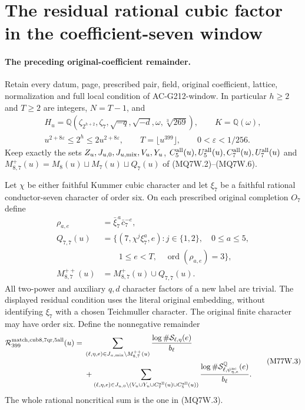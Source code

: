 \section{The residual rational cubic factor in the coefficient-seven window}
\label{sec:mixed-cubic-seven-at-seven-window}

\paragraph{The preceding original-coefficient remainder.}
Retain every datum, page, prescribed pair, field, original coefficient,
lattice, normalization and full local condition of AC-G212-window.
In particular $h\geq2$ and $T\geq2$ are integers, $N=T-1$, and
\[
 \begin{gathered}
 H_u=\mathbb Q(\zeta_{2^{h+2}},\zeta_7,\sqrt{-q},\sqrt{-d},
                   \omega,\sqrt[3]{269}),\qquad K=\mathbb Q(\omega),\\
 u^{2+8\varepsilon}\leq2^h\leq2u^{2+8\varepsilon},\qquad
 T=\lfloor u^{399}\rfloor,\qquad0<\varepsilon<1/256.
 \end{gathered}\tag{M77W.1}
\]
Keep exactly the sets $Z_u,J_{u,0},J_{u,\rm mix},V_u,Y_u$,
$C_5^{\rm all}(u),U_5^{\rm all}(u),C_7^{\rm all}(u),U_7^{\rm all}(u)$
and $M_{8,7}^{+}(u)=M_8(u)\sqcup M_7(u)\sqcup Q_7(u)$
of (MQ7W.2)--(MQ7W.6).

Let $\chi$ be either faithful Kummer cubic character and let
$\xi_7$ be a faithful rational conductor-seven character of order six.
On each prescribed original completion $O_7$ define
\[
 \begin{split}
 \rho_{a,e}&=\bar\xi_7^{\,a}\bar c_7^{-e},\\
 Q_{7,7}(u)&=\{(7,\chi^j\xi_7^a,e):j\in\{1,2\},\quad0\leq a\leq5,\\
       &\qquad1\leq e<T,\quad\operatorname{ord}(\rho_{a,e})=3\},\\
 M_{8,7}^{++}(u)&=M_{8,7}^{+}(u)\cup Q_{7,7}(u).
 \end{split}\tag{M77W.2}
\]
All two-power and auxiliary $q,d$ character factors of a new label
are trivial. The displayed residual condition uses the literal
original embedding, without identifying $\xi_7$ with a chosen
Teichmuller character. The original finite character may have order six.
Define the nonnegative remainder
\[
 \begin{split}
 \mathcal R_{399}^{\rm match,cub8,7qr,5all}(u)={}&
  \sum_{(\ell,\eta,e)\in J_{u,\rm mix}\setminus M_{8,7}^{++}(u)}
                  \frac{\log\#\mathcal S_{\ell,\eta}(e)}{b_\ell}\\
 &+\sum_{(\ell,\eta,e)\in
       J_{u,0}\setminus(V_u\cup Y_u\cup C_7^{\rm all}(u)
                                         \cup C_5^{\rm all}(u))}
       \frac{\log\#\mathcal S^{\mathbb Q}_{\ell,
                             \psi_{\eta,e}^{\rm nc}}(e)}{b_\ell}.
 \end{split}\tag{M77W.3}
\]
The whole rational noncritical sum is the one in (MQ7W.3).

